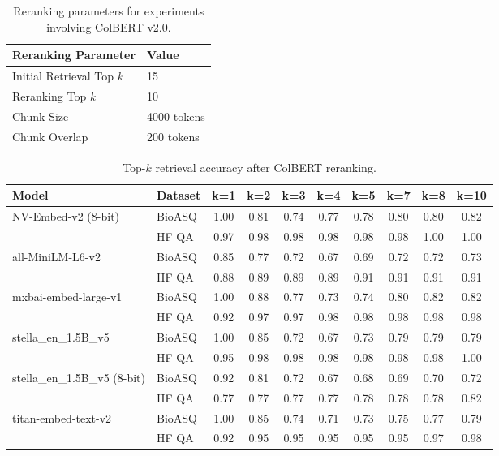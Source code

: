 \documentclass{scrartcl}
\begin{document}
\begin{table}[H]
\centering
\begin{tabular}{|l|l|}
\hline
\textbf{Reranking Parameter} & \textbf{Value} \\
\hline
Initial Retrieval Top $k$ & 15 \\
Reranking Top $k$ & 10 \\
Chunk Size & 4000 tokens \\
Chunk Overlap & 200 tokens \\
\hline
\end{tabular}
\caption{Reranking parameters for experiments involving ColBERT v2.0.}
\label{table:rerank_params}
\end{table}

\begin{table}[H]
\centering
\small
\begin{tabular}{l l c c c c c c c c}
\hline
\textbf{Model} & \textbf{Dataset} & \textbf{k=1} & \textbf{k=2} & \textbf{k=3} & \textbf{k=4} & \textbf{k=5} & \textbf{k=7} & \textbf{k=8} & \textbf{k=10} \\
\hline
\multirow{2}{*}{NV-Embed-v2 (8-bit)} 
 & BioASQ & 1.00 & 0.81 & 0.74 & 0.77 & 0.78 & 0.80 & 0.80 & 0.82 \\
 & HF QA  & 0.97 & 0.98 & 0.98 & 0.98 & 0.98 & 0.98 & 1.00 & 1.00 \\
\hline
\multirow{2}{*}{all-MiniLM-L6-v2} 
 & BioASQ & 0.85 & 0.77 & 0.72 & 0.67 & 0.69 & 0.72 & 0.72 & 0.73 \\
 & HF QA  & 0.88 & 0.89 & 0.89 & 0.89 & 0.91 & 0.91 & 0.91 & 0.91 \\
\hline
\multirow{2}{*}{mxbai-embed-large-v1} 
 & BioASQ & 1.00 & 0.88 & 0.77 & 0.73 & 0.74 & 0.80 & 0.82 & 0.82 \\
 & HF QA  & 0.92 & 0.97 & 0.97 & 0.98 & 0.98 & 0.98 & 0.98 & 0.98 \\
\hline
\multirow{2}{*}{stella\_en\_1.5B\_v5} 
 & BioASQ & 1.00 & 0.85 & 0.72 & 0.67 & 0.73 & 0.79 & 0.79 & 0.79 \\
 & HF QA  & 0.95 & 0.98 & 0.98 & 0.98 & 0.98 & 0.98 & 0.98 & 1.00 \\
\hline
\multirow{2}{*}{stella\_en\_1.5B\_v5 (8-bit)} 
 & BioASQ & 0.92 & 0.81 & 0.72 & 0.67 & 0.68 & 0.69 & 0.70 & 0.72 \\
 & HF QA  & 0.77 & 0.77 & 0.77 & 0.77 & 0.78 & 0.78 & 0.78 & 0.82 \\
\hline
\multirow{2}{*}{titan-embed-text-v2} 
 & BioASQ & 1.00 & 0.85 & 0.74 & 0.71 & 0.73 & 0.75 & 0.77 & 0.79 \\
 & HF QA  & 0.92 & 0.95 & 0.95 & 0.95 & 0.95 & 0.95 & 0.97 & 0.98 \\
\hline
\end{tabular}
\caption{Top-$k$ retrieval accuracy after ColBERT reranking.}
\label{table:rerank_results}
\end{table}
\end{document}
